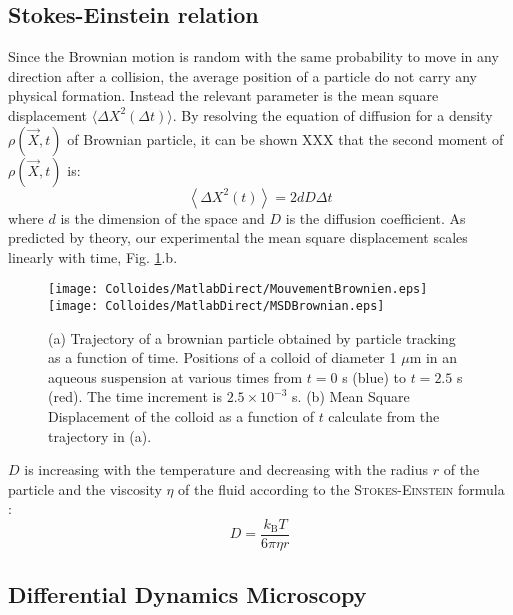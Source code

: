 \documentclass[%
 aip,
 jmp,%
 amsmath,amssymb,
reprint,%
]{revtex4-1}
\begin{document}
\subsection{Stokes-Einstein relation}

Since the Brownian motion is random with the same probability to move in any direction after a collision, the average position of a particle do not carry any physical formation. Instead the relevant parameter is the mean square displacement \citep{11_ken2003molecular} $\langle \Delta X^2(\Delta t) \rangle$. By resolving the equation of diffusion for a density $\rho(\vec{X}, t)$ of Brownian particle, it can be shown XXX that the second moment of $\rho(\vec{X}, t)$ is:
\begin{equation}
\left\langle \Delta X^2(t) \right\rangle = 2dD \Delta t
\end{equation}
where $d$ is the dimension of the space and $D$ is the diffusion coefficient. As predicted by theory, our experimental the mean square displacement scales linearly with time, Fig. \ref{BrownianTrajectory}.b.

\begin{figure}
	\texttt{[image: Colloides/MatlabDirect/MouvementBrownien.eps]}\\
	\texttt{[image: Colloides/MatlabDirect/MSDBrownian.eps]}
	\caption{(a) Trajectory of a brownian particle obtained by particle tracking as a function of time. Positions of a colloid of diameter 1 $\mu$m in an aqueous suspension at various times from $t=0$ s (blue) to $t=2.5$ s (red). The time increment is $2.5 \times 10^{-3}$ s. (b) Mean Square Displacement of the colloid as a function of $t$ calculate from the trajectory in (a). }
	\label{BrownianTrajectory}
\end{figure}

$D$ is increasing with the temperature and decreasing with the radius $r$ of the particle and the viscosity $\eta$ of the fluid according to the \textsc{Stokes-Einstein} formula \citep{9_einstein1906theory}:
\begin{equation}
D = \frac{k_\text{B} T}{6 \pi \eta r}
\end{equation}


\subsection{Differential Dynamics Microscopy}
\end{document}
